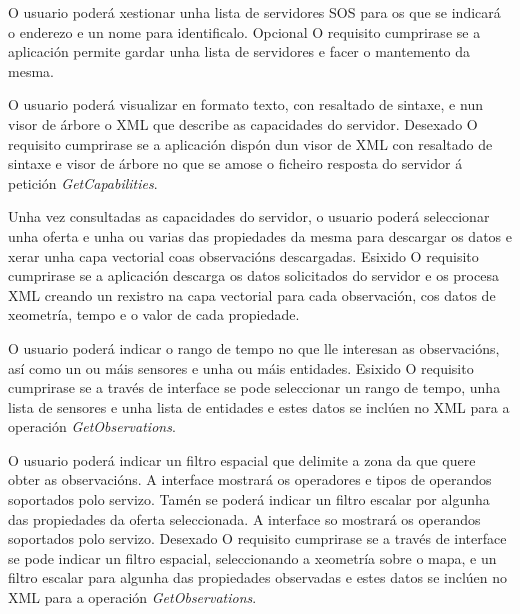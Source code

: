 		  	{O usuario poderá xestionar unha lista de servidores SOS para os que se indicará o enderezo e un nome para identificalo.}%
			{Opcional}%
			{O requisito cumprirase se a aplicación permite gardar unha lista de servidores e facer o mantemento da mesma.}%
			
		  	{O usuario poderá visualizar en formato texto, con resaltado de sintaxe, e nun visor de árbore o XML que describe as capacidades do servidor.}%
			{Desexado}%
			{O requisito cumprirase se a aplicación dispón dun visor de XML con resaltado de sintaxe e visor de árbore no que se amose o ficheiro resposta do servidor á petición \emph{GetCapabilities}.}%
			
		  	{Unha vez consultadas as capacidades do servidor, o usuario poderá seleccionar unha oferta e unha ou varias das propiedades da mesma para descargar os datos e xerar unha capa vectorial coas observacións descargadas.}%
			{Esixido}%
			{O requisito cumprirase se a aplicación descarga os datos solicitados do servidor e os procesa XML creando un rexistro na capa vectorial para cada observación, cos datos de xeometría, tempo e o valor de cada propiedade.}%
			
		  	{O usuario poderá indicar o rango de tempo no que lle interesan as observacións, así como un ou máis sensores e unha ou máis entidades.}%
			{Esixido}%
			{O requisito cumprirase se a través de interface se pode seleccionar un rango de tempo, unha lista de sensores e unha lista de entidades e estes datos se inclúen no XML para a operación \emph{GetObservations}.}%
			
		  	{O usuario poderá indicar un filtro espacial que delimite a zona da que quere obter as observacións. A interface mostrará os operadores e tipos de operandos soportados polo servizo. Tamén se poderá indicar un filtro escalar por algunha das propiedades da oferta seleccionada. A interface so mostrará os operandos soportados polo servizo.}%
			{Desexado}%
			{O requisito cumprirase se a través de interface se pode indicar un filtro espacial, seleccionando a xeometría sobre o mapa, e un filtro escalar para algunha das propiedades observadas e estes datos se inclúen no XML para a operación \emph{GetObservations}.}%
			
